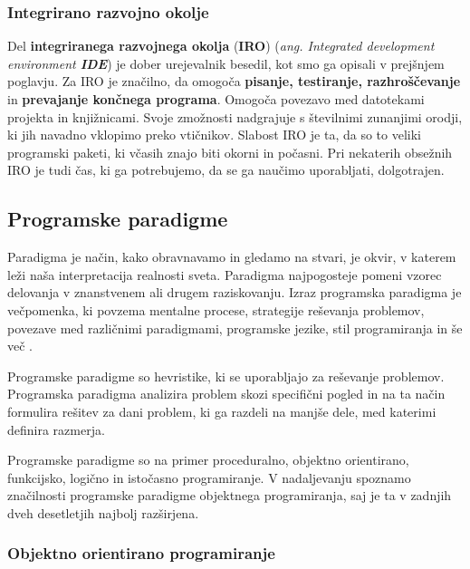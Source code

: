 \subsubsection{Integrirano razvojno okolje}
\label{sec:integrirano-raz-okolje}

Del \textbf{integriranega razvojnega okolja} (\textbf{IRO})
(\emph{ang. Integrated development environment \textbf{IDE}}) je dober
urejevalnik besedil, kot smo ga opisali v prejšnjem poglavju. Za IRO
je značilno, da omogoča \textbf{pisanje, testiranje, razhroščevanje}
in \textbf{prevajanje končnega programa}. Omogoča povezavo med
datotekami projekta in knjižnicami. Svoje zmožnosti nadgrajuje s
številnimi zunanjimi orodji, ki jih navadno vklopimo preko
vtičnikov. Slabost IRO je ta, da so to veliki programski paketi, ki včasih
znajo biti okorni in počasni. Pri nekaterih obsežnih IRO je tudi čas,
ki ga potrebujemo, da se ga naučimo uporabljati, dolgotrajen.

\subsection{Programske paradigme}
\label{sec:programske_paradigme}

Paradigma je način, kako obravnavamo in gledamo na stvari, je okvir, v
katerem leži naša interpretacija realnosti sveta. Paradigma
najpogosteje pomeni vzorec delovanja v znanstvenem ali drugem
raziskovanju. Izraz programska paradigma je večpomenka, ki povzema
mentalne procese, strategije reševanja problemov, povezave med
različnimi paradigmami, programske jezike, stil programiranja in še
več \cite{wiki:paradigme} \cite{guideTCS}.

Programske paradigme so hevristike, ki se uporabljajo za reševanje
problemov. Programska paradigma analizira problem skozi specifični
pogled in na ta način formulira rešitev za dani problem, ki ga razdeli
na manjše dele, med katerimi definira razmerja.

Programske paradigme so na primer proceduralno, objektno orientirano,
funkcijsko, logično in istočasno programiranje. V nadaljevanju
spoznamo značilnosti programske paradigme objektnega programiranja,
saj je ta v zadnjih dveh desetletjih najbolj razširjena. 

\subsubsection{Objektno orientirano programiranje}
\label{sec:objektno_orijentirano_programiranje}

